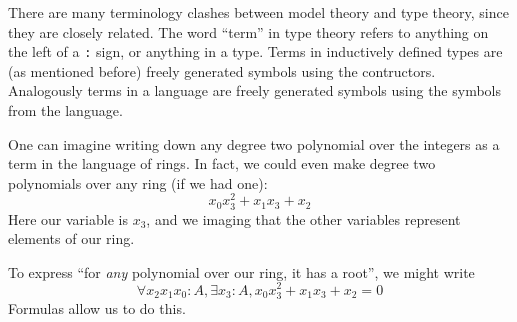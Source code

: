 \begin{rmk}
  There are many terminology clashes between model theory and type theory,
  since they are closely related.
  The word ``term'' in type theory refers to anything on the left of a \texttt{:} sign,
  or anything in a type.
  Terms in inductively defined types are (as mentioned before)
  freely generated symbols using the contructors.
  Analogously terms in a language are freely generated symbols using
  the symbols from the language.
\end{rmk}

One can imagine writing down any degree two polynomial over the integers
as a term in the language of rings.
In fact, we could even make degree two polynomials over any ring (if we had one):
\[ x_{0} x_{3}^{2} + x_{1} x_{3} + x_{2} \]
Here our variable is $x_{3}$, and we imaging that the other variables represent
elements of our ring.

To express ``for \textit{any} polynomial over our ring, it has a root'',
we might write
\[ \forall x_{2} x_{1} x_{0} : A, \exists x_{3} : A, x_{0} x_{3}^{2} + x_{1} x_{3} + x_{2} = 0 \]
Formulas allow us to do this.

